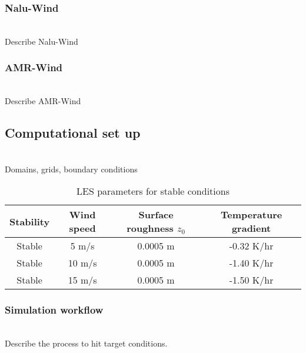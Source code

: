 \subsubsection{Nalu-Wind}
\\
Describe Nalu-Wind

\subsubsection{AMR-Wind}
\\
Describe AMR-Wind

\subsection{Computational set up}
\\
Domains, grids, boundary conditions

\begin{table}
\caption{\label{tab:Computational parameters} LES parameters for stable conditions}
\centering
\begin{tabular}{cccc}
  \hline
  Stability    & Wind speed  & Surface roughness $z_0$ & Temperature gradient \\
  \hline
  Stable       & 5  m/s           & 0.0005 m       & -0.32 K/hr      \\
  Stable       & 10 m/s           & 0.0005 m       & -1.40 K/hr      \\
  Stable       & 15 m/s           & 0.0005 m       & -1.50 K/hr      \\
\hline
\end{tabular}
\end{table}

\subsubsection{Simulation workflow}
\\
Describe the process to hit target conditions.




